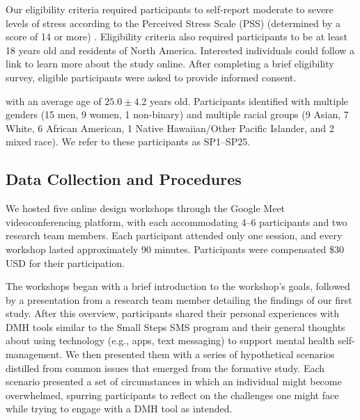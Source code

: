 Our eligibility criteria required participants to self-report moderate to severe levels of stress according to the Perceived Stress Scale (PSS) (determined by a score of 14 or more) \cite{cohen1994perceived}.  Eligibility criteria also required participants to be at least 18 years old and residents of North America. 
Interested individuals could follow a link to learn more about the study online. After completing a brief eligibility survey, eligible participants were asked to provide informed consent.


 with an average age of $25.0\pm4.2$ years old. Participants identified with multiple genders (15 men, 9 women, 1 non-binary) and multiple racial groups (9 Asian, 7 White, 6 African American, 1 Native Hawaiian/Other Pacific Islander, and 2 mixed race). 
 We refer to these participants as SP1--SP25. 

\subsection{Data Collection and Procedures}

We hosted five online design workshops through the Google Meet videoconferencing platform, with each accommodating 4–6 participants and two research team members. Each participant attended only one session, and every workshop lasted approximately 90 minutes. Participants were compensated \$30 USD for their participation.

The workshops began with a brief introduction to the workshop's goals, followed by a presentation from a research team member detailing the findings of our first study. After this overview, participants shared their personal experiences with DMH tools similar to the Small Steps SMS program and their general thoughts about using technology (e.g., apps, text messaging) to support mental health self-management.  We then presented them with a series of hypothetical scenarios distilled from common issues that emerged from the formative study. Each scenario presented a set of circumstances in which an individual might become overwhelmed, spurring participants to reflect on the challenges one might face while trying to engage with a DMH tool as intended. 




